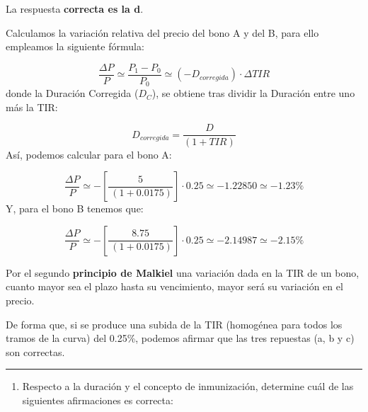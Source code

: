 \documentclass[
  letterpaper,
  DIV=11,
  numbers=noendperiod]{scrartcl}
\providecommand{\tightlist}{%
  \setlength{\itemsep}{0pt}\setlength{\parskip}{0pt}}\usepackage{longtable,booktabs,array}
\begin{document}
\begin{tcolorbox}[enhanced jigsaw, colframe=quarto-callout-note-color-frame, opacityback=0, colback=white, leftrule=.75mm, left=2mm, breakable, arc=.35mm, rightrule=.15mm, toprule=.15mm, bottomrule=.15mm]
\begin{minipage}[t]{5.5mm}
\textcolor{quarto-callout-note-color}{\faInfo}
\end{minipage}%
\begin{minipage}[t]{\textwidth - 5.5mm}

La respuesta \textbf{correcta es la d}.

Calculamos la variación relativa del precio del bono A y del B, para
ello empleamos la siguiente fórmula:

\[\frac{\Delta P}{P}\simeq  \frac{P_1-P_0}{P_0}\simeq \left(-D_{corregida}\right)\cdot\Delta TIR\]
donde la Duración Corregida (\(D_C\)), se obtiene tras dividir la
Duración entre uno más la TIR:

\[D_{corregida}=\frac{D}{\left(1+TIR\right)}\] Así, podemos calcular
para el bono A:

\[\frac{\Delta P}{P}\simeq-\left[\frac{5}{\:\left(1+0.0175\right)}\right]\cdot 0.25\simeq-1.22850\simeq-1.23\%\]
Y, para el bono B tenemos que:

\[\frac{\Delta P}{P}\simeq-\left[\frac{8.75}{\:\left(1+0.0175\right)}\right]\cdot 0.25\simeq-2.14987\simeq
-2.15\%\]

Por el segundo \textbf{principio de Malkiel} una variación dada en la
TIR de un bono, cuanto mayor sea el plazo hasta su vencimiento, mayor
será su variación en el precio.

De forma que, si se produce una subida de la TIR (homogénea para todos
los tramos de la curva) del 0.25\%, podemos afirmar que las tres
repuestas (a, b y c) son correctas.

\end{minipage}%
\end{tcolorbox}

\begin{center}\rule{0.5\linewidth}{0.5pt}\end{center}

\begin{enumerate}
\def\labelenumi{\arabic{enumi}.}
\setcounter{enumi}{3}
\tightlist
\item
  Respecto a la duración y el concepto de inmunización, determine cuál
  de las siguientes afirmaciones es correcta:
\end{enumerate}
\end{document}
